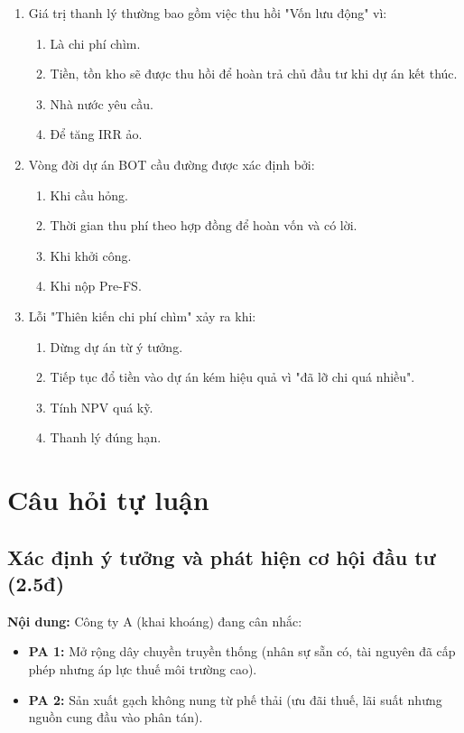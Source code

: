 \begin{enumerate}[label=\textbf{Câu \arabic*:}, leftmargin=*, resume]
\item Giá trị thanh lý thường bao gồm việc thu hồi "Vốn lưu động" vì:
\begin{enumerate}[label=\Alph*.]
    \item Là chi phí chìm.
    \item Tiền, tồn kho sẽ được thu hồi để hoàn trả chủ đầu tư khi dự án kết thúc.
    \item Nhà nước yêu cầu.
    \item Để tăng IRR ảo.
\end{enumerate}

\item Vòng đời dự án BOT cầu đường được xác định bởi:
\begin{enumerate}[label=\Alph*.]
    \item Khi cầu hỏng.
    \item Thời gian thu phí theo hợp đồng để hoàn vốn và có lời.
    \item Khi khởi công.
    \item Khi nộp Pre-FS.
\end{enumerate}

\item Lỗi "Thiên kiến chi phí chìm" xảy ra khi:
\begin{enumerate}[label=\Alph*.]
    \item Dừng dự án từ ý tưởng.
    \item Tiếp tục đổ tiền vào dự án kém hiệu quả vì "đã lỡ chi quá nhiều".
    \item Tính NPV quá kỹ.
    \item Thanh lý đúng hạn.
\end{enumerate}

\end{enumerate}
\section{Câu hỏi tự luận}
\subsection{Xác định ý tưởng và phát hiện cơ hội đầu tư (2.5đ)}
\textbf{Nội dung:} Công ty A (khai khoáng) đang cân nhắc:
\begin{itemize}
    \item \textbf{PA 1:} Mở rộng dây chuyền truyền thống (nhân sự sẵn có, tài nguyên đã cấp phép nhưng áp lực thuế môi trường cao).
    \item \textbf{PA 2:} Sản xuất gạch không nung từ phế thải (ưu đãi thuế, lãi suất nhưng nguồn cung đầu vào phân tán).
\end{itemize}

